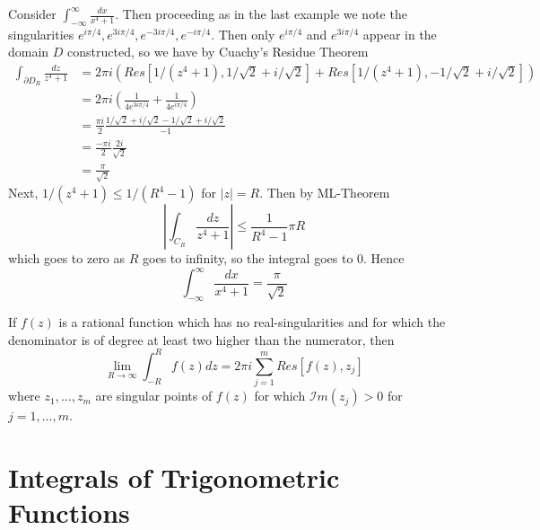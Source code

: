 \documentclass[12pt, a4paper, oneside, openright, titlepage]{book}
\begin{document}
\begin{eg}
    Consider $\int_{-\infty}^{\infty}\frac{dx}{x^4+1}$. Then proceeding as in the last example we note the singularities $e^{i\pi/4},e^{3i\pi/4},e^{-3i\pi/4},e^{-i\pi/4}$. Then only $e^{i\pi/4}$ and $e^{3i\pi/4}$ appear in the domain $D$ constructed, so we have by Cuachy's Residue Theorem \begin{align*}
        \int_{\partial D_R}\frac{dz}{z^4+1} &= 2\pi i(Res[1/(z^4+1),1/\sqrt{2}+i/\sqrt{2}]+Res[1/(z^4+1),-1/\sqrt{2}+i/\sqrt{2}]) \\
        &= 2\pi i\left(\frac{1}{4e^{3i\pi/4}}+\frac{1}{4e^{i\pi/4}}\right) \\
        &= \frac{\pi i}{2}\frac{1/\sqrt{2}+i/\sqrt{2}-1/\sqrt{2}+i/\sqrt{2}}{-1} \\
        &= \frac{-\pi i}{2}\frac{2i}{\sqrt{2}} \\
        &= \frac{\pi}{\sqrt{2}}
    \end{align*}
    Next, $1/(z^4+1) \leq 1/(R^4-1)$ for $|z| = R$. Then by ML-Theorem \begin{equation*}
        \left|\int_{C_R}\frac{dz}{z^4+1}\right| \leq \frac{1}{R^4-1}\pi R
    \end{equation*}
    which goes to zero as $R$ goes to infinity, so the integral goes to $0$. Hence \begin{equation*}
        \int_{-\infty}^{\infty}\frac{dx}{x^4+1} = \frac{\pi}{\sqrt{2}}
    \end{equation*}
\end{eg}

\begin{prop}
    If $f(z)$ is a rational function which has no real-singularities and for which the denominator is of degree at least two higher than the numerator, then \begin{equation*}
        \lim\limits_{R\rightarrow \infty}\int_{-R}^Rf(z)dz = 2\pi i \sum_{j=1}^mRes[f(z),z_j]
    \end{equation*}
    where $z_1,...,z_m$ are singular points of $f(z)$ for which $\mathscr{I}m(z_j) > 0$ for $j = 1,...,m$.
\end{prop}





\section{Integrals of Trigonometric Functions}
\end{document}
